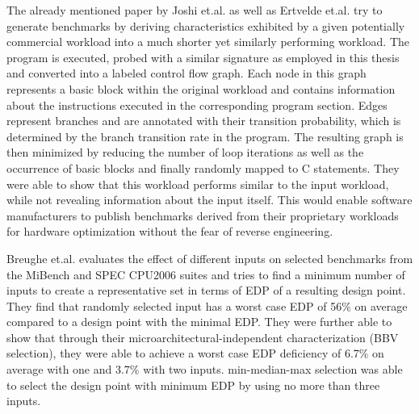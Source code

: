 \documentclass[../bachelor_paper.tex]{subfiles}
\begin{document}
The already mentioned paper by Joshi et.al. \cite{joshiDistillingEssenceProprietary2008} as well as Ertvelde et.al. \cite{vanertveldeBenchmarkSynthesisArchitecture2010} try to generate benchmarks by deriving characteristics exhibited by a given potentially commercial workload into a much shorter yet similarly performing workload. The program is executed, probed with a similar signature as employed in this thesis and converted into a labeled control flow graph. Each node in this graph represents a basic block within the original workload and contains information about the instructions executed in the corresponding program section. Edges represent branches and are annotated with their transition probability, which is determined by the branch transition rate in the program. The resulting graph is then minimized by reducing the number of loop iterations as well as the occurrence of basic blocks and finally randomly mapped to C statements. They were able to show that this workload performs similar to the input workload, while not revealing information about the input itself. This would enable software manufacturers to publish benchmarks derived from their proprietary workloads for hardware optimization without the fear of reverse engineering.

Breughe et.al. \cite{breugheSelectingRepresentativeBenchmark2013} evaluates the effect of different inputs on selected benchmarks from the MiBench and SPEC CPU2006 suites and tries to find a minimum number of inputs to create a representative set in terms of \ac{EDP} of a resulting design point. They find that randomly selected input has a worst case \ac{EDP} of 56\% on average compared to a design point with the minimal \ac{EDP}. They were further able to show that through their microarchitectural-independent characterization (BBV selection), they were able to achieve a worst case \ac{EDP} deficiency of 6.7\% on average with one and 3.7\% with two inputs. min-median-max selection was able to select the design point with minimum \ac{EDP} by using no more than three inputs.
\end{document}
